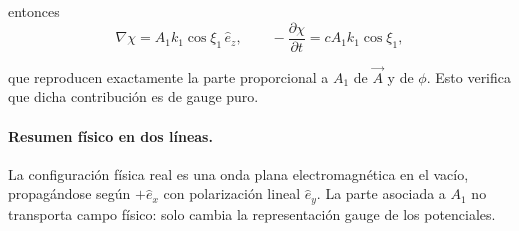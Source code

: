 \documentclass{article}
\numberwithin{equation}{section}
\begin{document}
entonces
\begin{equation}
\nabla\chi=A_1k_1\cos\xi_1\,\hat e_z,
\qquad
-\frac{\partial\chi}{\partial t}=cA_1k_1\cos\xi_1,
\end{equation}

que reproducen exactamente la parte proporcional a $A_1$ de $\vec A$ y de $\phi$. Esto verifica que dicha contribución es de gauge puro.


\paragraph{Resumen físico en dos líneas.}
La configuración física real es una onda plana electromagnética en el vacío, propagándose según $+\hat e_x$ con polarización lineal $\hat e_y$. La parte asociada a $A_1$ no transporta campo físico: solo cambia la representación gauge de los potenciales.
\end{document}
